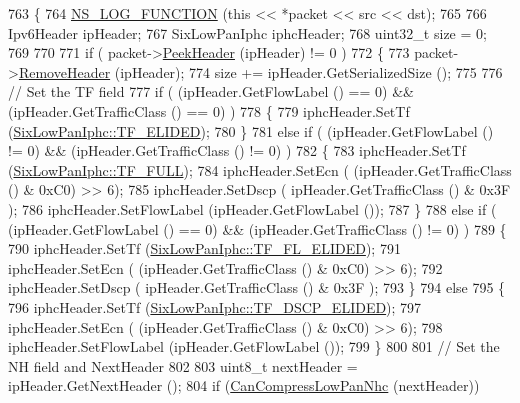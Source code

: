 \begin{DoxyCode}
763 \{
764   \hyperlink{log-macros-disabled_8h_a90b90d5bad1f39cb1b64923ea94c0761}{NS\_LOG\_FUNCTION} (\textcolor{keyword}{this} << *packet << src << dst);
765 
766   Ipv6Header ipHeader;
767   SixLowPanIphc iphcHeader;
768   uint32\_t size = 0;
769 
770 
771   \textcolor{keywordflow}{if} ( packet->\hyperlink{classns3_1_1Packet_aadc63487bea70945c418f4c3e9b81964}{PeekHeader} (ipHeader) != 0 )
772     \{
773       packet->\hyperlink{classns3_1_1Packet_a0961eccf975d75f902d40956c93ba63e}{RemoveHeader} (ipHeader);
774       size += ipHeader.GetSerializedSize ();
775 
776       \textcolor{comment}{// Set the TF field}
777       \textcolor{keywordflow}{if} ( (ipHeader.GetFlowLabel () == 0) && (ipHeader.GetTrafficClass () == 0) )
778         \{
779           iphcHeader.SetTf (\hyperlink{classns3_1_1SixLowPanIphc_ac4bbe4168668e3b0656582cfa757b7dca02b42f506e03adcd3222480f81af1dc3}{SixLowPanIphc::TF\_ELIDED});
780         \}
781       \textcolor{keywordflow}{else} \textcolor{keywordflow}{if} ( (ipHeader.GetFlowLabel () != 0) && (ipHeader.GetTrafficClass () != 0) )
782         \{
783           iphcHeader.SetTf (\hyperlink{classns3_1_1SixLowPanIphc_ac4bbe4168668e3b0656582cfa757b7dcab374d0f6554d306b0ee29fd9ff83a5ef}{SixLowPanIphc::TF\_FULL});
784           iphcHeader.SetEcn ( (ipHeader.GetTrafficClass () & 0xC0) >> 6);
785           iphcHeader.SetDscp ( ipHeader.GetTrafficClass () & 0x3F );
786           iphcHeader.SetFlowLabel (ipHeader.GetFlowLabel ());
787         \}
788       \textcolor{keywordflow}{else} \textcolor{keywordflow}{if} ( (ipHeader.GetFlowLabel () == 0) && (ipHeader.GetTrafficClass () != 0) )
789         \{
790           iphcHeader.SetTf (\hyperlink{classns3_1_1SixLowPanIphc_ac4bbe4168668e3b0656582cfa757b7dca616bab00b36d2ac76b009acbeb1105fa}{SixLowPanIphc::TF\_FL\_ELIDED});
791           iphcHeader.SetEcn ( (ipHeader.GetTrafficClass () & 0xC0) >> 6);
792           iphcHeader.SetDscp ( ipHeader.GetTrafficClass () & 0x3F );
793         \}
794       \textcolor{keywordflow}{else}
795         \{
796           iphcHeader.SetTf (\hyperlink{classns3_1_1SixLowPanIphc_ac4bbe4168668e3b0656582cfa757b7dcaf64261a5e5ef77a117b16328645ce6b8}{SixLowPanIphc::TF\_DSCP\_ELIDED});
797           iphcHeader.SetEcn ( (ipHeader.GetTrafficClass () & 0xC0) >> 6);
798           iphcHeader.SetFlowLabel (ipHeader.GetFlowLabel ());
799         \}
800 
801       \textcolor{comment}{// Set the NH field and NextHeader}
802 
803       uint8\_t nextHeader = ipHeader.GetNextHeader ();
804       \textcolor{keywordflow}{if} (\hyperlink{classns3_1_1SixLowPanNetDevice_a44cfa681aaac7a83c160e9cdfc90d7e0}{CanCompressLowPanNhc} (nextHeader))

\end{DoxyCode}
